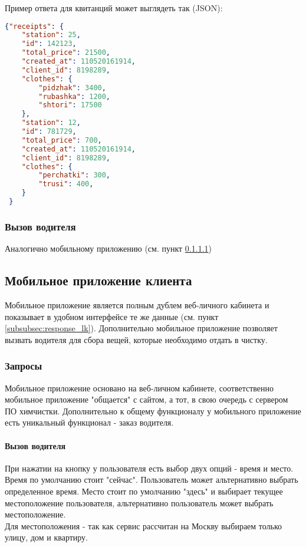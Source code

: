 \documentclass[DIV=calc, paper=a4, fontsize=11pt]{scrartcl} %
\begin{document}
Пример ответа для квитанций может выглядеть так (JSON):
\begin{lstlisting}[language=json,firstnumber=1]
{"receipts": {
	"station": 25,
	"id": 142123,
	"total_price": 21500,
	"created_at": 110520161914,
	"client_id": 8198289,
	"clothes": {
		"pidzhak": 3400,
		"rubashka": 1200,
		"shtori": 17500
	},
	"station": 12,
	"id": 781729,
	"total_price": 700,
	"created_at": 110520161914,
	"client_id": 8198289,
	"clothes": {
		"perchatki": 300,
		"trusi": 400,
	}
 }
\end{lstlisting}

\subsubsection{Вызов водителя}
Аналогично мобильному приложению (см. пункт \ref{paragraph:driver_call})

\subsection{Мобильное приложение клиента}
Мобильное приложение является полным дублем веб-личного кабинета и показывает в удобном интерфейсе те же данные (см. пункт \ref{subsubsec:response_lk}). Дополнительно мобильное приложение позволяет вызвать водителя для сбора вещей, которые необходимо отдать в чистку.

\subsubsection{Запросы}
Мобильное приложение основано на веб-личном кабинете, соответственно мобильное приложение "общается" с сайтом, а тот, в свою очередь с сервером ПО химчистки. Дополнительно к общему функционалу у мобильного приложение есть уникальный функционал - заказ водителя.

\paragraph{Вызов водителя}\label{paragraph:driver_call}
При нажатии на кнопку у пользователя есть выбор двух опций - время и место. Время по умолчанию стоит "сейчас". Пользователь может альтернативно выбрать определенное время. Место стоит по умолчанию "здесь" и выбирает текущее местоположение пользователя, альтернативно пользователь может выбрать местоположение.
\\[0.5cm]
Для местоположения - так как сервис рассчитан на Москву выбираем только улицу, дом и квартиру.
\end{document}
